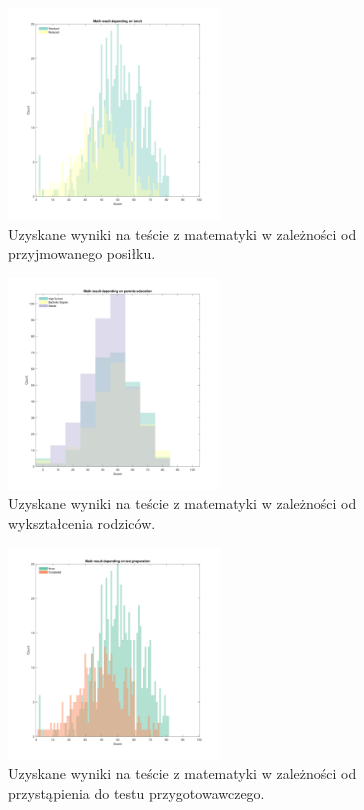 \documentclass[12pt]{article}
\begin{document}
\begin{figure}[H]
\centering
\includegraphics[width=0.5\textwidth]{hist_math_score_per_lunch.pdf}
\caption{Uzyskane wyniki na teście z matematyki w zależności od przyjmowanego posiłku.}
\end{figure}

\begin{figure}[H]
\centering
\includegraphics[width=0.5\textwidth]{hist_math_score_per_parent_education.pdf}
\caption{Uzyskane wyniki na teście z matematyki w zależności od wykształcenia rodziców.}
\end{figure}

\begin{figure}[H]
\centering
\includegraphics[width=0.5\textwidth]{hist_math_score_per_test_prep.pdf}
\caption{Uzyskane wyniki na teście z matematyki w zależności od przystąpienia do testu przygotowawczego.}
\end{figure}
\end{document}
